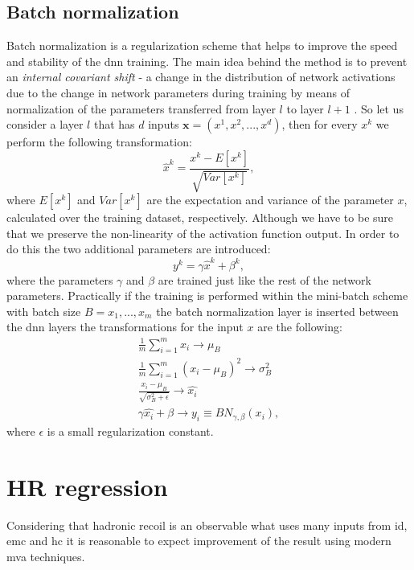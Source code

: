 \subsection{Batch normalization}
Batch normalization is a regularization scheme that helps to improve the speed and stability of the \gls{dnn} training. The main idea behind the method is to prevent an \textit{internal covariant shift} - a change in the distribution of network activations due to the change in network parameters during training by means of normalization of the parameters transferred from layer $l$ to layer $l+1$  \cite{batch_normalization}. So let us consider a layer $l$ that has $d$ inputs $\textbf{x}=(x^1,x^2,...,x^d)$, then for every $x^k$ we perform the following transformation:
\begin{equation}
\label{eq::bn1}
\hat{x}^k=\frac{x^k-E[x^k]}{\sqrt{Var[x^k]}},
\end{equation}
where $E[x^k]$ and $Var[x^k]$ are the expectation and variance of the parameter $x$, calculated over the training dataset, respectively. Although we have to be sure that we preserve the non-linearity of the activation function output. In order to do this the two additional parameters are introduced:
\begin{equation}
\label{eq::bn2}
y^k=\gamma  \hat{x}^k + \beta^k ,
\end{equation}
where the parameters $\gamma$ and $\beta$ are trained just like the rest of the network parameters.
Practically if the training is performed within the mini-batch scheme with batch size $B={x_1,...,x_m}$ the batch normalization layer is inserted between the \gls{dnn} layers the transformations for the input $x$ are the following:
\begin{equation}
\begin{array}{lcl} 
\frac{1}{m}\sum_{i=1}^m x_i \rightarrow \mu_B\\
\frac{1}{m}\sum_{i=1}^m (x_i - \mu_B)^2 \rightarrow \sigma^2_B\\
\frac {x_i-\mu_B}{\sqrt{\sigma_B^2+\epsilon}} \rightarrow \hat{x_i}\\
\gamma \hat{x_i} + \beta \rightarrow y_i \equiv BN_{\gamma,\beta}(x_i),
\end{array}
\end{equation}
where $\epsilon$ is a small regularization constant. 
\section{HR regression}
Considering that hadronic recoil is an observable what uses many inputs from \gls{id}, \gls{emc} and \gls{hc} it is reasonable to expect improvement of the result using modern \gls{mva} techniques. 
